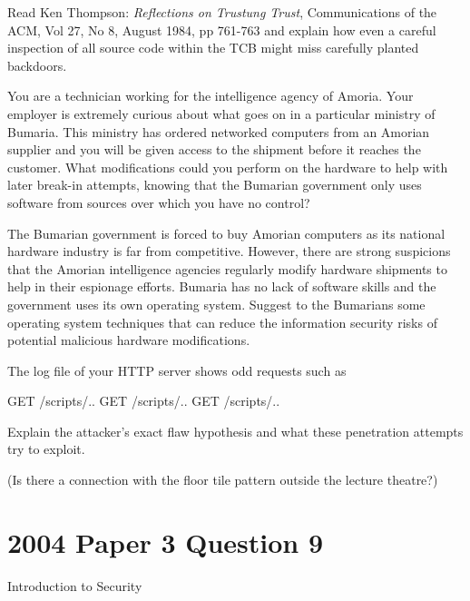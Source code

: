 \documentclass{supervision}
\begin{document}
  \begin{questions}
    \question Read Ken Thompson: \textit{Reflections on Trustung Trust},
      Communications of the ACM, Vol 27, No 8, August 1984, pp 761-763 and
      explain how even a careful inspection of all source code within the TCB
      might miss carefully planted backdoors.

    \question You are a technician working for the intelligence agency of
      Amoria. Your employer is extremely curious about what goes on in a
      particular ministry of Bumaria. This ministry has ordered networked
      computers from an Amorian supplier and you will be given access to the
      shipment before it reaches the customer. What modifications could you
      perform on the hardware to help with later break-in attempts, knowing that
      the Bumarian government only uses software from sources over which you
      have no control?

    \question The Bumarian government is forced to buy Amorian computers as its
      national hardware industry is far from competitive. However, there are
      strong suspicions that the Amorian intelligence agencies regularly modify
      hardware shipments to help in their espionage efforts. Bumaria has no lack
      of software skills and the government uses its own operating system.
      Suggest to the Bumarians some operating system techniques that can reduce
      the information security risks of potential malicious hardware
      modifications.

    \question The log file of your HTTP server shows odd requests such as
      \begin{code}{{}}
        GET /scripts/..%
        GET /scripts/..%
        GET /scripts/..%
      \end{code}

      Explain the attacker’s exact flaw hypothesis and what these penetration
      attempts try to exploit.

      (Is there a connection with the floor tile pattern outside the lecture
      theatre?)

    \section*{2004 Paper 3 Question 9}
    \question Introduction to Security
      \begin{parts}

\end{parts}
\end{questions}
\end{document}

